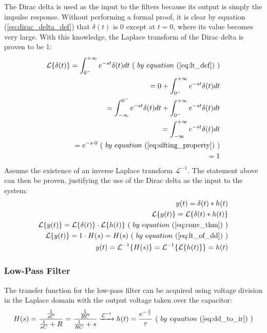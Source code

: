 The Dirac delta is used as the input to the filters because its output is simply the impulse response. Without performing a formal proof, it is clear by equation (\ref{eq:dirac_delta_def}) that $\delta(t)$ is 0 except at $t = 0$, where its value becomes very large. With this knowledge, the Laplace transform of the Dirac delta is proven to be 1:
\begin{equation}
	\label{eq:lt_of_dd}
	\begin{aligned}
		\mathcal{L}\{\delta(t)\} = \int_{0^{-}}^{+\infty} e^{-st}\delta(t)dt \ ( \ by \ equation \ (\ref{eq:lt_def}) \ ) \\
				       = 0 + \int_{0^{-}}^{+\infty} e^{-st}\delta(t)dt \\
				       = \int_{-\infty}^{0^{-}} e^{-st}\delta(t)dt + \int_{0^{-}}^{+\infty} e^{-st}\delta(t)dt \\
				       = \int_{-\infty}^{+\infty} e^{-st}\delta(t)dt \\
				       = e^{-s \cdot 0} \ ( \ by \ equation \ (\ref{eq:sifting_property}) \ ) \\
				       = 1
	\end{aligned}
\end{equation}
Assume the existence of an inverse Laplace transform $\mathcal{L}^{-1}$. The statement above can then be proven, justifying the use of the Dirac delta as the input to the system:
\begin{equation}
	\label{eq:dd_to_ir}
	\begin{aligned}
		y(t) = \delta(t) * h(t) \\
		\mathcal{L}\{y(t)\} = \mathcal{L}\{\delta(t) * h(t)\} \\
		\mathcal{L}\{y(t)\} = \mathcal{L}\{\delta(t)\} \cdot \mathcal{L}\{h(t)\} \ ( \ by \ equation \ (\ref{eq:conv_thm}) \ ) \\
		\mathcal{L}\{y(t)\} = 1 \cdot H(s) = H(s) \ ( \ by \ equation \ (\ref{eq:lt_of_dd}) \ ) \\
		y(t) = \mathcal{L}^{-1}\{H(s)\} = \mathcal{L}^{-1}\{\mathcal{L}\{h(t)\}\} = h(t)
	\end{aligned}
\end{equation}

\subsubsection{Low-Pass Filter}
The transfer function for the low-pass filter can be acquired using voltage division in the Laplace domain with the output voltage taken over the capacitor:
\begin{equation}
	\label{eq:tf_lpf}
	H(s) = \frac{ \frac{ 1 }{ sC } }{ \frac{ 1 }{ sC } + R } = \frac{ \frac{ 1 }{ RC } }{ \frac{ 1 }{ RC } + s } \xrightarrow{\mathcal{L}^{-1}} h(t) = \frac{ e^{-\frac{t}{\tau}} }{ \tau } \ ( \ by \ equation \ (\ref{eq:dd_to_ir}) \ )
\end{equation}

